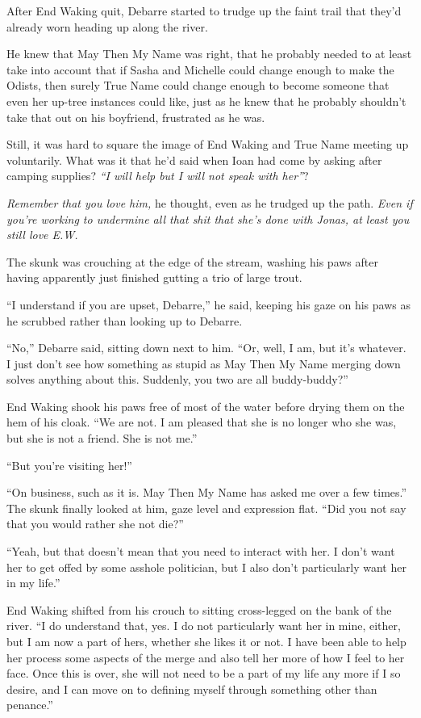 After End Waking quit, Debarre started to trudge up the faint trail that they'd already worn heading up along the river.

He knew that May Then My Name was right, that he probably needed to at least take into account that if Sasha and Michelle could change enough to make the Odists, then surely True Name could change enough to become someone that even her up-tree instances could like, just as he knew that he probably shouldn't take that out on his boyfriend, frustrated as he was.

Still, it was hard to square the image of End Waking and True Name meeting up voluntarily. What was it that he'd said when Ioan had come by asking after camping supplies? \emph{``I will help but I will not speak with her''}?

\emph{Remember that you love him,} he thought, even as he trudged up the path. \emph{Even if you're working to undermine all that shit that she's done with Jonas, at least you still love E.W.}

The skunk was crouching at the edge of the stream, washing his paws after having apparently just finished gutting a trio of large trout.

``I understand if you are upset, Debarre,'' he said, keeping his gaze on his paws as he scrubbed rather than looking up to Debarre.

``No,'' Debarre said, sitting down next to him. ``Or, well, I am, but it's whatever. I just don't see how something as stupid as May Then My Name merging down solves anything about this. Suddenly, you two are all buddy-buddy?''

End Waking shook his paws free of most of the water before drying them on the hem of his cloak. ``We are not. I am pleased that she is no longer who she was, but she is not a friend. She is not me.''

``But you're visiting her!''

``On business, such as it is. May Then My Name has asked me over a few times.'' The skunk finally looked at him, gaze level and expression flat. ``Did you not say that you would rather she not die?''

``Yeah, but that doesn't mean that you need to interact with her. I don't want her to get offed by some asshole politician, but I also don't particularly want her in my life.''

End Waking shifted from his crouch to sitting cross-legged on the bank of the river. ``I do understand that, yes. I do not particularly want her in mine, either, but I am now a part of hers, whether she likes it or not. I have been able to help her process some aspects of the merge and also tell her more of how I feel to her face. Once this is over, she will not need to be a part of my life any more if I so desire, and I can move on to defining myself through something other than penance.''

